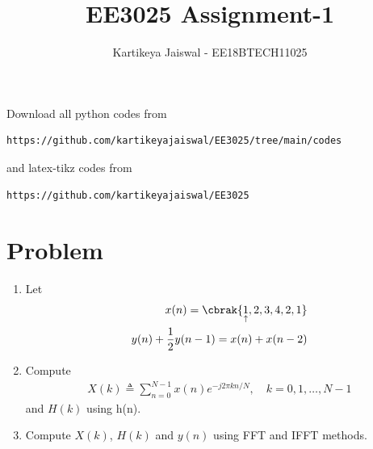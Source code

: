 \documentclass[journal,12pt,twocolumn]{IEEEtran}
\renewcommand\thesection{\arabic{section}}
\begin{document}
     \def\rightbox#1{\makebox[0in][r]{#1}}
     \def\centbox#1{\makebox[0in]{#1}}
     \def\topbox#1{\raisebox{-\baselineskip}[0in][0in]{#1}}
     \def\midbox#1{\raisebox{-0.5\baselineskip}[0in][0in]{#1}}
\vspace{3cm}
\title{EE3025 Assignment-1}
\author{Kartikeya Jaiswal - EE18BTECH11025}
\maketitle
\newpage
\bigskip
\renewcommand{\thefigure}{\theenumi}
\renewcommand{\thetable}{\theenumi}
Download all python codes from 
\begin{lstlisting}
https://github.com/kartikeyajaiswal/EE3025/tree/main/codes
\end{lstlisting}
%
and latex-tikz codes from 
%
\begin{lstlisting}
https://github.com/kartikeyajaiswal/EE3025
\end{lstlisting}
\section{Problem}
\begin{enumerate}[label=\thesection.\arabic*.,ref=\thesection.\theenumi]
    
    \item Let
    \begin{align}
        x(n) = \cbrak{\underset{\uparrow}{1},2,3,4,2,1}
         \label{eq:equation0}\\
        y(n) + \frac{1}{2}y(n-1) = x(n) + x(n-2)	
        \label{eq:equation1}
    \end{align}
    
    \item Compute 
    \begin{align}
        X(k) \triangleq \sum_{n=0}^{N-1} x(n) e^{-j 2 \pi k n / N}, \quad k=0,1, \ldots, N-1
    \end{align}
    and $H(k)$ using h(n).
    
    \item Compute $X(k)$, $H(k)$ and $y(n)$ using FFT and IFFT methods.
\end{enumerate}
\end{document}
